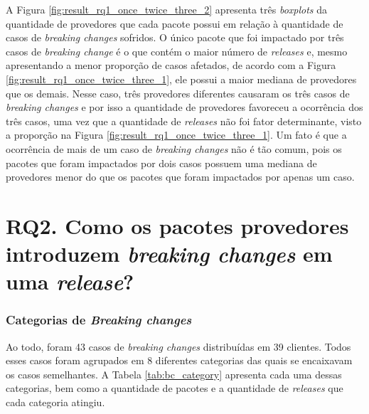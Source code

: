 A Figura \ref{fig:result_rq1_once_twice_three_2} apresenta três \textit{boxplots} da quantidade de provedores que cada pacote possui em relação à quantidade de casos de \textit{breaking changes} sofridos. O único pacote que foi impactado por três casos de \textit{breaking change} é o que contém o maior número de \textit{releases} e, mesmo apresentando a menor proporção de casos afetados, de acordo com a Figura \ref{fig:result_rq1_once_twice_three_1}, ele possui a maior mediana de provedores que os demais. Nesse caso, três provedores diferentes causaram os três casos de \textit{breaking changes} e por isso a quantidade de provedores favoreceu a ocorrência dos três casos, uma vez que a quantidade de \textit{releases} não foi fator determinante, visto a proporção na Figura \ref{fig:result_rq1_once_twice_three_1}.  Um fato é que a ocorrência de mais de um caso de \textit{breaking changes} não é tão comum, pois os pacotes que foram impactados por dois casos possuem uma mediana de provedores menor do que os pacotes que foram impactados por apenas um caso.


\section{RQ2. Como os pacotes provedores introduzem \textit{breaking changes} em uma \textit{release}?}


\subsubsection{Categorias de \textit{Breaking changes}}
Ao todo, foram 43 casos de \textit{breaking changes} distribuídas em 39 clientes. Todos esses casos foram agrupados em 8 diferentes categorias das quais se encaixavam os casos semelhantes. A Tabela \ref{tab:bc_category} apresenta cada uma dessas categorias, bem como a quantidade de pacotes e a quantidade de \textit{releases} que cada categoria atingiu.

